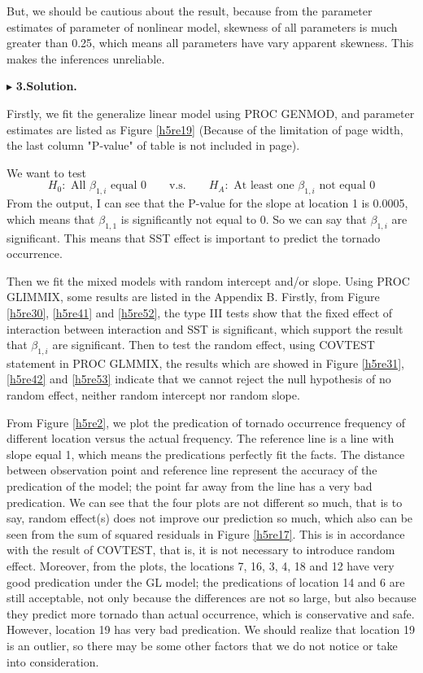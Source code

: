 \documentclass[letterpaper, 12pt]{article}
\begin{document}
But, we should be cautious about the result, because from the parameter estimates of parameter of nonlinear model, skewness of all parameters is much greater than 0.25, which means all parameters have vary apparent skewness. This makes the inferences unreliable.


$\blacktriangleright$ \textbf{3.\quad Solution.} 

Firstly, we fit the generalize linear model using PROC GENMOD, and parameter estimates are listed as Figure \ref{h5re19} (Because of the limitation of page width, the last column "P-value" of table is not included in page).

We want to test
$$
H_0: \text{ All $\beta_{1,i}$ equal 0}\qquad\text{v.s.}\qquad H_A: \text{ At least one $\beta_{1,i}$ not equal 0}
$$
From the output, I can see that the P-value for the slope at location 1 is 0.0005, which means that $\beta_{1,1}$ is significantly not equal to 0. So we can say that $\beta_{1,i}$ are significant. This means that SST effect is important to predict the tornado occurrence. 

    Then we fit the mixed models with random intercept and/or slope. Using PROC GLIMMIX, some results are listed in the Appendix B. Firstly, from Figure \ref{h5re30}, \ref{h5re41} and \ref{h5re52}, the type III tests show that the fixed effect of interaction between interaction and SST is significant, which support the result that $\beta_{1,i}$ are significant. Then to test the random effect, using COVTEST statement in PROC GLMMIX, the results which are showed in Figure \ref{h5re31}, \ref{h5re42} and \ref{h5re53} indicate that we cannot reject the null hypothesis of no random effect, neither random intercept nor random slope. 
    
    From Figure \ref{h5re2}, we plot the predication of tornado occurrence frequency of different location versus the actual frequency. The reference line is a line with slope equal 1, which means the predications perfectly fit the facts. The distance between observation point and reference line represent the accuracy of the predication of the model; the point far away from the line has a very bad predication. We can see that the four plots are not different so much, that is to say, random effect(s) does not improve our prediction so much, which also can be seen from the sum of squared residuals in Figure \ref{h5re17}. This is in accordance with the result of COVTEST, that is, it is not necessary to introduce random effect.  Moreover, from the plots, the locations 7, 16, 3, 4, 18 and 12 have very good predication under the GL model; the predications of location 14 and 6 are still acceptable, not only because the differences are not so large, but also because they predict more tornado than actual occurrence, which is conservative and safe. However, location 19 has very bad predication. We should realize that location 19 is an outlier, so there may be some other factors that we do not notice or take into consideration. 
\end{document}

